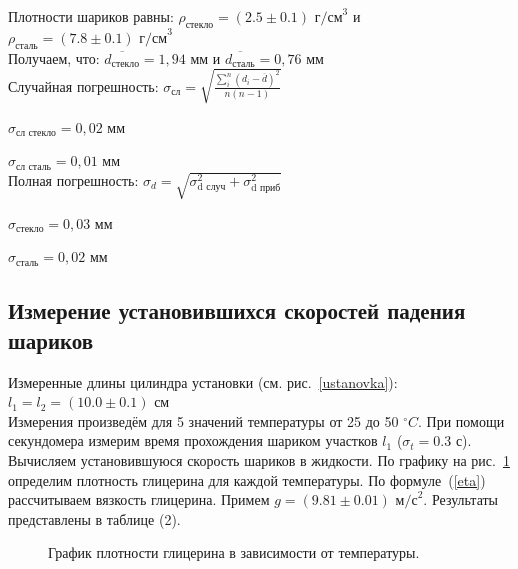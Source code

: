 \documentclass[a4paper]{article}
\begin{document}
    Плотности шариков равны: $\rho_\text{стекло}=(2.5 \pm 0.1) \text{ г/см}^3$ и $\rho_\text{сталь}=(7.8 \pm 0.1) \text{ г/см}^3$\\

    Получаем, что: $\overline{d_\text{стекло}} = 1,94\text{ мм}$ и $\overline{d_\text{сталь}} = 0,76 \text{ мм}$\\

    Случайная погрешность: $\sigma_\text{сл} = \sqrt{\frac{\sum_i^n(d_i - \overline{d})^2}{n(n-1)}}$

    $\sigma_\text{сл стекло} = 0,02\text{ мм}$

    $\sigma_\text{сл сталь} =  0,01\text{ мм}$\\

    Полная погрешность: $\sigma_d = \sqrt{\sigma_\text{d случ}^2 + \sigma_\text{d приб}^2}$

    $\sigma_\text{стекло} = 0,03\text{ мм}$

    $\sigma_\text{сталь} =  0,02\text{ мм}$


    \subsection{Измерение установившихся скоростей падения шариков}

    Измеренные длины цилиндра установки (см. рис.~\ref{ustanovka}): $l_1 = l_2 = (10.0 \pm 0.1)\text{ см}$ \\

    Измерения произведём для 5 значений температуры от 25 до 50 $ ^\circ C $. При помощи секундомера измерим время прохождения шариком участков $l_1$ ($ \sigma_t = 0.3\text{ с}$). Вычисляем установившуюся скорость шариков в жидкости. По графику на рис.~\ref{density} определим плотность глицерина для каждой температуры. По формуле~(\ref{eta}) рассчитываем вязкость глицерина. Примем $g = (9.81 \pm 0.01)\text{ м/с}^2$. Результаты представлены в таблице (2).

    \begin{figure}[ht]
        \caption{График плотности глицерина в зависимости от температуры.}
        \label{density}
    \end{figure}
\end{document}
